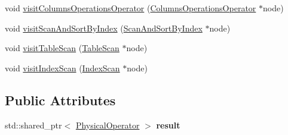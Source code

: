 \begin{DoxyCompactItemize}
\item 
void \hyperlink{class_cloning_physical_operator_visitor_ad818258fa87a049e49d255107f655819}{visit\+Columns\+Operations\+Operator} (\hyperlink{class_columns_operations_operator}{Columns\+Operations\+Operator} $\ast$node)
\item 
void \hyperlink{class_cloning_physical_operator_visitor_a5bead629c3b23b39316b8b86913617e7}{visit\+Scan\+And\+Sort\+By\+Index} (\hyperlink{class_scan_and_sort_by_index}{Scan\+And\+Sort\+By\+Index} $\ast$node)
\item 
void \hyperlink{class_cloning_physical_operator_visitor_aa7066c58c8963023737f1b8e0eca7bca}{visit\+Table\+Scan} (\hyperlink{class_table_scan}{Table\+Scan} $\ast$node)
\item 
void \hyperlink{class_cloning_physical_operator_visitor_ae5e119521bb2d4654eebba24bc469739}{visit\+Index\+Scan} (\hyperlink{class_index_scan}{Index\+Scan} $\ast$node)
\end{DoxyCompactItemize}
\subsection*{Public Attributes}
\begin{DoxyCompactItemize}
\item 
\hypertarget{class_cloning_physical_operator_visitor_aa3705b767976ef07fdfe39458543138e}{std\+::shared\+\_\+ptr$<$ \hyperlink{class_physical_operator}{Physical\+Operator} $>$ {\bfseries result}}\label{class_cloning_physical_operator_visitor_aa3705b767976ef07fdfe39458543138e}

\end{DoxyCompactItemize}


